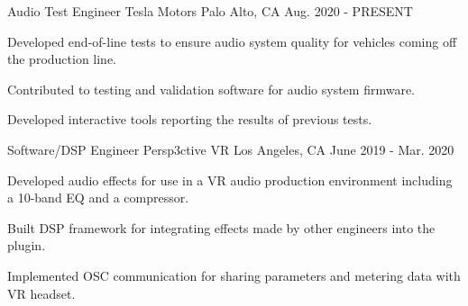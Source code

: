 

\begin{cventries}

  \cventry
    {Audio Test Engineer} %
    {Tesla Motors} %
    {Palo Alto, CA} %
    {Aug. 2020 - PRESENT} %
    {
      \begin{cvitems} %
        \item {Developed end-of-line tests to ensure audio system quality for vehicles coming off the production line.}
        \item {Contributed to testing and validation software for audio system firmware.}
        \item {Developed interactive tools reporting the results of previous tests.}
      \end{cvitems}
    }

  \cventry
    {Software/DSP Engineer} %
    {Persp3ctive VR} %
    {Los Angeles, CA} %
    {June 2019 - Mar. 2020} %
    {
      \begin{cvitems} %
        \item {Developed audio effects for use in a VR audio production environment
               including a 10-band EQ and a compressor.}
        \item {Built DSP framework for integrating effects made by other engineers into the plugin.}
        \item {Implemented OSC communication for sharing parameters and metering data with VR headset.}
      \end{cvitems}
    }



\end{cventries}
